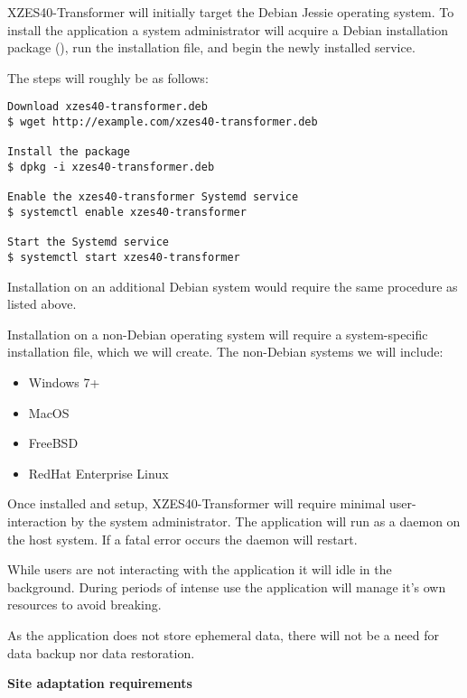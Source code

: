 XZES40-Transformer will initially target the Debian Jessie operating system.
To install the application a system administrator will acquire a Debian installation package (), run the installation file, and begin the newly installed service.

The steps will roughly be as follows:
\begin{lstlisting}[caption={Hypothetical installation setup steps}]
Download xzes40-transformer.deb
$ wget http://example.com/xzes40-transformer.deb

Install the package
$ dpkg -i xzes40-transformer.deb

Enable the xzes40-transformer Systemd service
$ systemctl enable xzes40-transformer

Start the Systemd service
$ systemctl start xzes40-transformer
\end{lstlisting}

Installation on an additional Debian system would require the same procedure as listed above.

Installation on a non-Debian operating system will require a system-specific installation file, which we will create.
The non-Debian systems we will include:
\begin{itemize}
  \item Windows 7+
  \item MacOS
  \item FreeBSD
  \item RedHat Enterprise Linux
\end{itemize}

Once installed and setup, XZES40-Transformer will require minimal user-interaction by the system administrator.
The application will run as a daemon on the host system.
If a fatal error occurs the daemon will restart.

While users are not interacting with the application it will idle in the background.
During periods of intense use the application will manage it's own resources to avoid breaking.

As the application does not store ephemeral data, there will not be a need for data backup nor data restoration.

\textbf{Site adaptation requirements}

